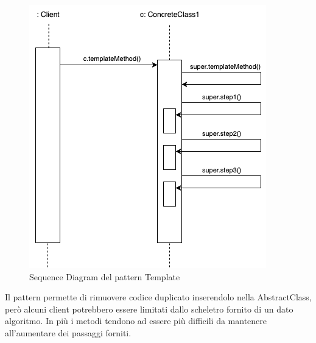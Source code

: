 \begin{figure}[H]
    \centering
    \includegraphics[width=0.5\linewidth]{assets/pattern/template/template-sequence.drawio.png}
    \caption{Sequence Diagram del pattern Template}
\end{figure}

Il pattern permette di rimuovere codice duplicato inserendolo nella AbstractClass, però alcuni client potrebbero essere limitati dallo scheletro fornito di un dato algoritmo. In più i metodi tendono ad essere più difficili da mantenere all'aumentare dei passaggi forniti.



\newpage